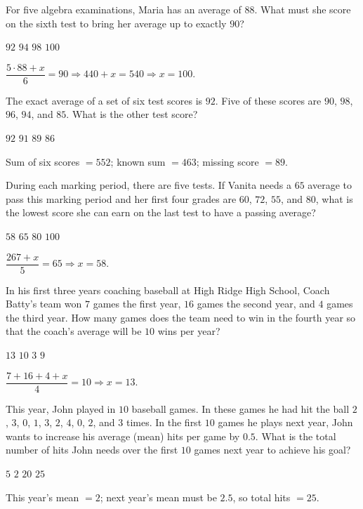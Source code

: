 \question[5]
For five algebra examinations, Maria has an average of $88$. What must she score on the sixth test to bring her average up to exactly $90$?
\begin{choices}
  \choice $92$
  \choice $94$
  \choice $98$
  \CorrectChoice $100$
\end{choices}
\begin{solution}
  $\dfrac{5\cdot 88 + x}{6}=90\Rightarrow 440+x=540\Rightarrow x=100$.
\end{solution}


\newpage



\question[5]
The exact average of a set of six test scores is $92$. Five of these scores are $90$, $98$, $96$, $94$, and $85$. What is the other test score?
\begin{choices}
  \choice $92$
  \choice $91$
  \CorrectChoice $89$
  \choice $86$
\end{choices}
\begin{solution}
  Sum of six scores $=552$; known sum $=463$; missing score $=89$.
\end{solution}

\question[5]
During each marking period, there are five tests. If Vanita needs a $65$ average to pass this marking period and her first four grades are $60$, $72$, $55$, and $80$, what is the lowest score she can earn on the last test to have a passing average?
\begin{choices}
  \CorrectChoice $58$
  \choice $65$
  \choice $80$
  \choice $100$
\end{choices}
\begin{solution}
  $\dfrac{267+x}{5}=65\Rightarrow x=58$.
\end{solution}

\question[5]
In his first three years coaching baseball at High Ridge High School, Coach Batty's team won $7$ games the first year, $16$ games the second year, and $4$ games the third year. How many games does the team need to win in the fourth year so that the coach's average will be $10$ wins per year?
\begin{choices}
  \CorrectChoice $13$
  \choice $10$
  \choice $3$
  \choice $9$
\end{choices}
\begin{solution}
  $\dfrac{7+16+4+x}{4}=10\Rightarrow x=13$.
\end{solution}

\question[5]
This year, John played in $10$ baseball games. In these games he had hit the ball $2$, $3$, $0$, $1$, $3$, $2$, $4$, $0$, $2$, and $3$ times. In the first $10$ games he plays next year, John wants to increase his average (mean) hits per game by $0.5$. What is the total number of hits John needs over the first $10$ games next year to achieve his goal?
\begin{choices}
  \choice $5$
  \choice $2$
  \choice $20$
  \CorrectChoice $25$
\end{choices}
\begin{solution}
  This year's mean $=2$; next year's mean must be $2.5$, so total hits $=25$.
\end{solution}


